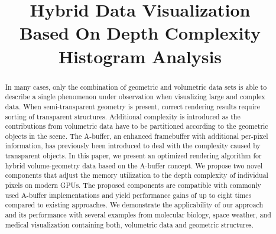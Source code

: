 \documentclass{egpubl}
\title[Hybrid Data Visualization]%
      {Hybrid Data Visualization\\ Based On Depth Complexity Histogram Analysis}
\author[]
        {}
\newcommand{\ab}{\mbox{A-buffer}}
\newlength{\imgWidth}
\newif\ifSplitBoxFramed
\newcommand{\splitImage}[2]{%
  \begin{tikzpicture}[x=\imgWidth,y=-\imgWidth] %
    \clip (0,0) rectangle (1,1);
    \begin{scope}[]
      \clip (0,0) -- (\topLineRatio,0) -- (\bottomLineRatio,1) -- (0,1);
      \draw(0,0) node[anchor=north west,inner sep=0pt]{%
        \texttt{[image: \#1]}};
    \end{scope}
    \begin{scope}[]
      \clip  (\topLineRatio,0) -- (\bottomLineRatio,1) -- (1,1) -- (1,0);
      \draw(0,0) node[anchor=north west,inner sep=0pt]{%
        \texttt{[image: \#2]}};
    \end{scope}
    \draw[black,very thick] (\topLineRatio,0) -- (\bottomLineRatio,1) ;
    \ifSplitBoxFramed%
      \draw[line width=1pt] (0,0) rectangle (1,1);
    \fi
  \end{tikzpicture}
}
\newcommand{\goldenRatioLong}{0.618}
\newcommand{\goldenRatioShort}{0.382}
\newcommand{\setSplitLineRatios}[2]{%
  \def\topLineRatio{#1}
  \def\bottomLineRatio{#2}
}
\begin{document}
\setSplitLineRatios{\goldenRatioLong}{\goldenRatioShort}


\maketitle

\begin{abstract}
%
In many cases, only the combination of geometric and volumetric data sets is able to describe a single phenomenon under observation when visualizing large and complex data.
When semi-transparent geometry is present, correct rendering results require sorting of transparent structures. 
Additional complexity is introduced as the contributions from volumetric data have to be partitioned according to the geometric objects in the scene.
The \ab{}, an enhanced framebuffer with additional per-pixel information, has previously been introduced to deal with the complexity caused by transparent objects. 
In this paper, we present an optimized rendering algorithm for hybrid volume-geometry data based on the \ab{} concept. 
We propose two novel components that adjust the memory utilization to the depth complexity of individual pixels on modern GPUs. 
The proposed components are compatible with commonly used \ab{} implementations and yield performance gains of up to eight times compared to existing approaches. 
%
We demonstrate the applicability of our approach and its performance with several examples from molecular biology, space weather, and medical visualization containing both, volumetric data and geometric structures.

\begin{classification} %
\end{classification}

\end{abstract}
\end{document}
